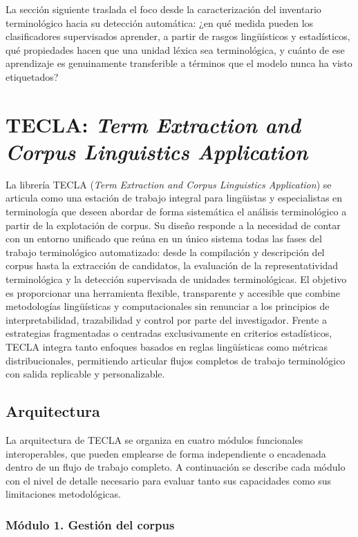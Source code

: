 La sección siguiente traslada el foco desde la caracterización del inventario terminológico hacia su detección automática: ¿en qué medida pueden los clasificadores supervisados aprender, a partir de rasgos lingüísticos y estadísticos, qué propiedades hacen que una unidad léxica sea terminológica, y cuánto de ese aprendizaje es genuinamente transferible a términos que el modelo nunca ha visto etiquetados?

\section{TECLA: \emph{Term Extraction and Corpus Linguistics Application}}
\label{sec:tecla}

La librería TECLA (\textit{Term Extraction and Corpus Linguistics Application}) se articula como una estación de trabajo integral para lingüistas y especialistas en terminología que deseen abordar de forma sistemática el análisis terminológico a partir de la explotación de corpus. Su diseño responde a la necesidad de contar con un entorno unificado que reúna en un único sistema todas las fases del trabajo terminológico automatizado: desde la compilación y descripción del corpus hasta la extracción de candidatos, la evaluación de la representatividad terminológica y la detección supervisada de unidades terminológicas. El objetivo es proporcionar una herramienta flexible, transparente y accesible que combine metodologías lingüísticas y computacionales sin renunciar a los principios de interpretabilidad, trazabilidad y control por parte del investigador. Frente a estrategias fragmentadas o centradas exclusivamente en criterios estadísticos, TECLA integra tanto enfoques basados en reglas lingüísticas como métricas distribucionales, permitiendo articular flujos completos de trabajo terminológico con salida replicable y personalizable.

\subsection{Arquitectura}
\label{subsec:arquitectura_tecla}

La arquitectura de TECLA se organiza en cuatro módulos funcionales interoperables, que pueden emplearse de forma independiente o encadenada dentro de un flujo de trabajo completo. A continuación se describe cada módulo con el nivel de detalle necesario para evaluar tanto sus capacidades como sus limitaciones metodológicas.

\subsubsection*{Módulo 1. Gestión del corpus}

